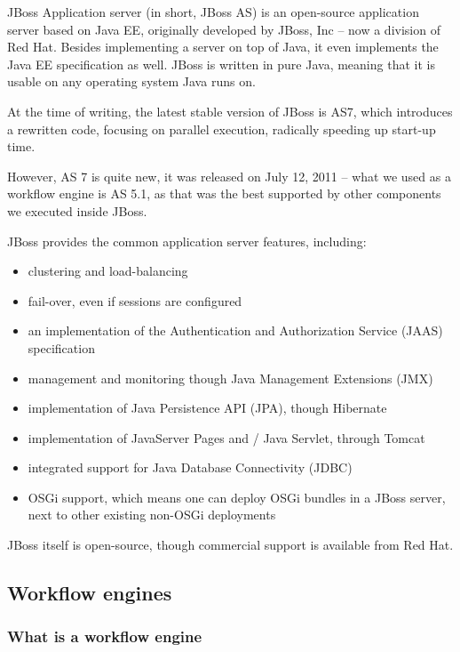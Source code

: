 JBoss Application server (in short, JBoss AS) is an open-source application server
based on Java EE, originally developed by JBoss, Inc -- now a division of Red
Hat. Besides implementing a server on top of Java, it even implements the Java
EE specification as well.  JBoss is written in pure Java, meaning that it is
usable on any operating system Java runs on.

At the time of writing, the latest stable version of JBoss is AS7, which
introduces a rewritten code, focusing on parallel execution, radically speeding
up start-up time\cite{jboss-fast}.

However, AS 7 is quite new, it was released on July 12, 2011 -- what we used as
a workflow engine is AS 5.1, as that was the best supported by other components
we executed inside JBoss.

JBoss provides the common application server features, including:

\begin{itemize}
\item clustering and load-balancing
\item fail-over, even if sessions are configured
\item an implementation of the Authentication and Authorization Service (JAAS)
specification
\item management and monitoring though Java Management Extensions (JMX)
\item implementation of Java Persistence API (JPA), though Hibernate
\item implementation of JavaServer Pages and / Java Servlet, through Tomcat
\item integrated support for Java Database Connectivity (JDBC)
\item OSGi support, which means one can deploy OSGi bundles in a JBoss server,
next to other existing non-OSGi deployments
\end{itemize}

JBoss itself is open-source, though commercial support is available from Red Hat.

\subsection{Workflow engines}

\subsubsection*{What is a workflow engine}

